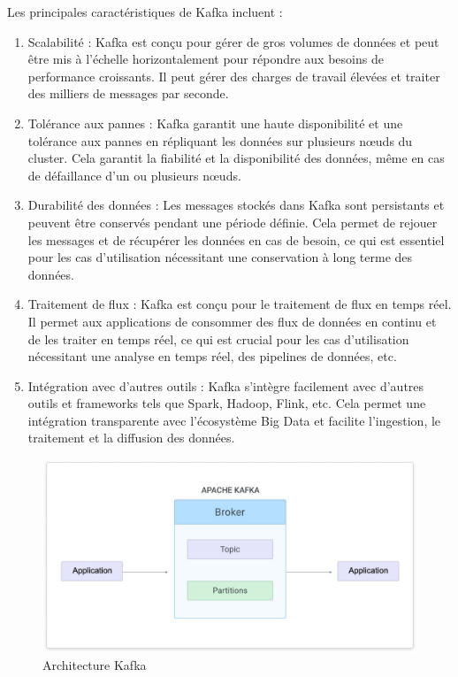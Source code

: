 Les principales caractéristiques de Kafka incluent :

\begin{enumerate}
	\item Scalabilité : Kafka est conçu pour gérer de gros volumes de données et peut être mis à l'échelle horizontalement pour répondre aux besoins de performance croissants. Il peut gérer des charges de travail élevées et traiter des milliers de messages par seconde.
	\item Tolérance aux pannes : Kafka garantit une haute disponibilité et une tolérance aux pannes en répliquant les données sur plusieurs nœuds du cluster. Cela garantit la fiabilité et la disponibilité des données, même en cas de défaillance d'un ou plusieurs nœuds.
	\item Durabilité des données : Les messages stockés dans Kafka sont persistants et peuvent être conservés pendant une période définie. Cela permet de rejouer les messages et de récupérer les données en cas de besoin, ce qui est essentiel pour les cas d'utilisation nécessitant une conservation à long terme des données.
	\item Traitement de flux : Kafka est conçu pour le traitement de flux en temps réel. Il permet aux applications de consommer des flux de données en continu et de les traiter en temps réel, ce qui est crucial pour les cas d'utilisation nécessitant une analyse en temps réel, des pipelines de données, etc.
	\item Intégration avec d'autres outils : Kafka s'intègre facilement avec d'autres outils et frameworks tels que Spark, Hadoop, Flink, etc. Cela permet une intégration transparente avec l'écosystème Big Data et facilite l'ingestion, le traitement et la diffusion des données.
\end{enumerate}

\begin{figure}[H]
\centering
\includegraphics[width=\linewidth]{images/kafka.jpg}
\caption{Architecture Kafka}\label{fig:kafka}
\end{figure}